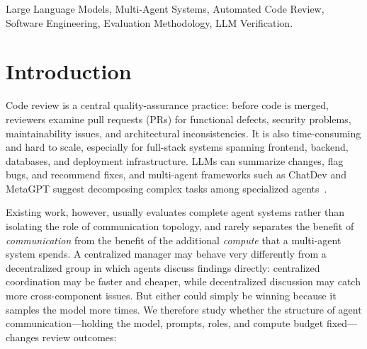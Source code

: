 \documentclass[conference]{IEEEtran}
\begin{document}
\begin{abstract}
hypothesis is null---at matched compute, role specialists tie plain
samples on recall ($p{=}0.73$)---and no multi-agent arm approaches the
single-pass baseline on F1 (0.36--0.38 vs.\ 0.49, Holm $p{<}0.001$):
extra homogeneous agents buy recall (0.63 vs.\ 0.50) but drown it in
false positives at 3--9$\times$ the cost, and the self-consistency rescue
our pilot suggested does not replicate. The verification axis is
different: findings corroborated by ${\geq}2$ independent model families
reach precision 0.72 vs.\ 0.54 single-arm at equal-or-higher F1, and
findings all three families agree on are real 89\% of the time vs.\ 54\%
for one model repeating itself across three runs (gap CI $[0.29, 0.41]$;
judge-invariant, $\kappa{=}0.95$ across two independent pair judges). In
multi-agent code review, diversity pays on the verification axis, not the
generation axis.
\end{abstract}

\begin{IEEEkeywords}
Large Language Models, Multi-Agent Systems, Automated Code Review, Software
Engineering, Evaluation Methodology, LLM Verification.
\end{IEEEkeywords}

\section{Introduction}

Code review is a central quality-assurance practice: before code is merged,
reviewers examine pull requests (PRs) for functional defects, security
problems, maintainability issues, and architectural inconsistencies. It is
also time-consuming and hard to scale, especially for full-stack systems
spanning frontend, backend, databases, and deployment infrastructure. LLMs
can summarize changes, flag bugs, and recommend fixes, and multi-agent
frameworks such as ChatDev and MetaGPT suggest decomposing complex tasks
among specialized agents~\cite{chatdev,metagpt}.

Existing work, however, usually evaluates complete agent systems rather than
isolating the role of communication topology, and rarely separates the
benefit of \emph{communication} from the benefit of the additional
\emph{compute} that a multi-agent system spends. A centralized manager may
behave very differently from a decentralized group in which agents discuss
findings directly: centralized coordination may be faster and cheaper, while
decentralized discussion may catch more cross-component issues. But either
could simply be winning because it samples the model more times. We
therefore study whether the structure of agent communication---holding the
model, prompts, roles, and compute budget fixed---changes review outcomes:
\end{document}
